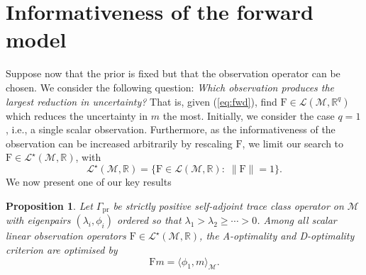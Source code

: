 \documentclass[ba]{imsart}
\theoremstyle{plain}
\newtheorem{proposition}[theorem]{Proposition}
\newcommand{\prcov}{\Gamma_{\mathrm{pr}}}
\newcommand{\R}{\mathbb{R}}
\newcommand{\F}{\mathrm{F}}
\newcommand{\dpar}{{m}}
\newcommand{\M}{\mathcal{M}}
\begin{document}
\section{Informativeness of the forward model}
Suppose now that the prior is fixed but that the observation operator can be chosen. We consider the following question: {\em Which observation produces the largest reduction in uncertainty?} That is, given (\ref{eq:fwd}), find $\F\in \mathcal{L}(\M,\R^q)$ which reduces the uncertainty in $\dpar$ the most. Initially, we consider the case $q=1$, i.e., a single scalar observation. Furthermore, as the informativeness of the observation can be increased arbitrarily by rescaling $\F$, we limit our search to $\F\in \mathcal{L}^\star(\M,\R)$, with 
\[\mathcal{L}^\star(\M,\R)=\{\F\in\mathcal{L}(\M,\R): \; \|\F\|=1\}.\]
We now present one of our key results
\begin{proposition}\label{prp:Aopt1}
Let $\prcov$ be strictly positive self-adjoint trace class operator on $\M$ with eigenpairs $(\lambda_i,\phi_i)$ ordered so that $\lambda_1> \lambda_2\geq\cdots >0$. Among all scalar linear observation operators $\F\in\mathcal{L}^\star(\M,\R)$, the A-optimality and D-optimality criterion are optimised by 
\[\F m=\langle \phi_1,m\rangle_\M.\]
\end{proposition}
\end{document}
